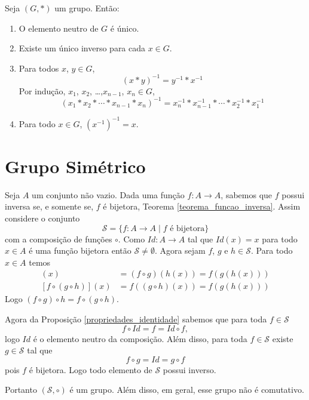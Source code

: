 \begin{proposicao}
	Seja $(G,*)$ um grupo. Ent\~ao:
	\begin{enumerate}[label={\roman*})]
		\item O elemento neutro de $G$ {\'e} {\'u}nico.

		\item Existe um {\'u}nico inverso para cada $x \in G$.

		\item Para todos $x$, $y \in G$,
		\[
			(x*y)^{-1} = y^{-1}*x^{-1}
		\]
		Por indu{\c c}{\~a}o, $x_1$, $x_2$, \dots ,$x_{n-1}$, $x_n \in G$,
		\[
			(x_1*x_2*\cdots *x_{n-1}*x_{n})^{-1} = x^{-1}_{n}*x^{-1}_{n-1}*\cdots *x^{-1}_2*x^{-1}_1
		\]
		\item Para todo $x \in G$, $(x^{-1})^{-1} = x$.
	\end{enumerate}
\end{proposicao}


\section{Grupo Sim\'etrico} %
\label{sec:grupo_sim\'etrico}

Seja $A$ um conjunto n\~ao vazio. Dada uma fun\c{c}\~ao $f : A \to A$, sabemos que $f$ possui inversa se, e somente se, $f$ \'e bijetora, Teorema \ref{teorema_funcao_inversa}. Assim considere o conjunto
\[
	\mathcal{S} = \{ f : A \to A \mid f \mbox{ \'e bijetora}\}
\]
com a composi\c{c}\~ao de fun\c{c}\~oes $\circ$. Como $Id : A \to A$ tal que $Id(x) = x$ para todo $x \in A$ \'e uma fun\c{c}\~ao bijetora ent\~ao $\mathcal{S} \ne \emptyset$. Agora sejam $f$, $g$ e $h \in \mathcal{S}$. Para todo $x \in A$ temos
\begin{align*}
	[(f\circ g)\circ h](x) &= (f \circ g)(h(x)) = f(g(h(x)))\\
	[f\circ(g\circ h)](x) &= f((g\circ h)(x)) = f(g(h(x)))
\end{align*}
Logo $(f\circ g)\circ h = f\circ(g\circ h)$.

Agora da Proposi\c{c}\~ao \ref{propriedades_identidade} sabemos que para toda $f \in \mathcal{S}$
\[
	f\circ Id = f = Id\circ f,
\]
logo $Id$ \'e o elemento neutro da composi\c{c}\~ao. Al\'em disso, para toda $f \in \mathcal{S}$ existe $g \in \mathcal{S}$ tal que
\[
	f\circ g = Id = g \circ f
\]
pois $f$ \'e bijetora. Logo todo elemento de $\mathcal{S}$ possui inverso.

Portanto $(\mathcal{S}, \circ)$ \'e um grupo. Al\'em disso, em geral, esse grupo n\~ao \'e comutativo.

